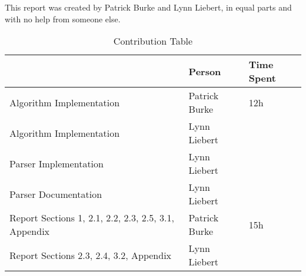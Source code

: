 This report was created by Patrick Burke and Lynn Liebert, in equal parts and with no help from someone else.

\vspace{2cm}
\vspace{2cm}

\vspace{7cm}

\begin{table}[H]
\centering
\caption*{Contribution Table}
\begin{tabular}{|p{5cm}|l|l|}
\hline
                         & Person        & Time Spent \\ \hline
Algorithm Implementation & Patrick Burke & 12h        \\ \hline
Algorithm Implementation & Lynn Liebert  &            \\ \hline
Parser Implementation    & Lynn Liebert  &            \\ \hline
Parser Documentation     & Lynn Liebert  &            \\ \hline
Report Sections 1, 2.1,
2.2, 2.3, 2.5, 3.1,
Appendix                 & Patrick Burke & 15h        \\ \hline
Report Sections 2.3,
2.4, 3.2, Appendix       & Lynn Liebert  &            \\ \hline

\end{tabular}
\end{table}
